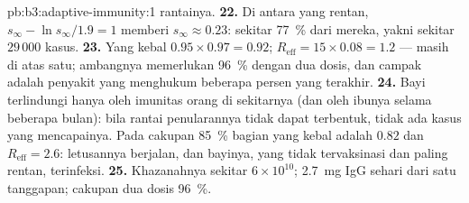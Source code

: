 \begin{solution}{pb:b3:adaptive-immunity:1}
rantainya.
\textbf{22.} Di antara yang rentan, $s_{\infty} - \ln s_{\infty}/1.9 =
1$ memberi $s_{\infty} \approx 0.23$: sekitar \qty{77}{\%} dari mereka, yakni sekitar
$29\,000$ kasus.
\textbf{23.} Yang kebal $0.95\times 0.97 = 0.92$; $R_{\text{eff}} = 15\times
0.08 = 1.2$ --- masih di atas satu; ambangnya memerlukan \qty{96}{\%} dengan
dua dosis, dan campak adalah penyakit yang menghukum beberapa persen yang
terakhir.
\textbf{24.} Bayi terlindungi hanya oleh imunitas orang di sekitarnya
(dan oleh  ibunya selama beberapa bulan): bila rantai
penularannya tidak dapat terbentuk, tidak ada kasus yang mencapainya. Pada cakupan \qty{85}{\%}
bagian yang kebal adalah $0.82$ dan $R_{\text{eff}} = 2.6$: letusannya
berjalan, dan bayinya, yang tidak tervaksinasi dan paling rentan, terinfeksi.
\textbf{25.} Khazanahnya sekitar $6\times 10^{10}$; \qty{2.7}{mg} IgG
sehari dari  satu tanggapan; cakupan dua dosis \qty{96}{\%}.
\end{solution}
